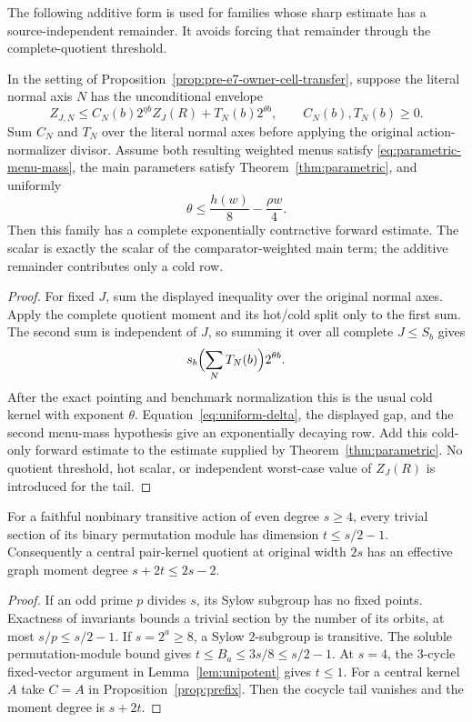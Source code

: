 The following additive form is used for families whose sharp estimate has a
source-independent remainder.  It avoids forcing that remainder through the
complete-quotient threshold.

\begin{proposition}
\label{prop:pre-e7-additive-tail-transfer}
In the setting of Proposition~\ref{prop:pre-e7-owner-cell-transfer}, suppose
the literal normal axis $N$ has the unconditional envelope
\[
 Z_{J,N}\leq C_N(b)2^{\eta b}Z_J(R)
                 +T_N(b)2^{\theta b},
 \qquad C_N(b),T_N(b)\geq0.
\]
Sum $C_N$ and $T_N$ over the literal normal axes before applying the original
action-normalizer divisor.  Assume both resulting weighted menus satisfy
\eqref{eq:parametric-menu-mass}, the main parameters satisfy
Theorem~\ref{thm:parametric}, and uniformly
\[
 \theta\leq \frac{h(w)}8-\frac{\rho w}4.
\]
Then this family has a complete exponentially contractive forward estimate.
The scalar is exactly the scalar of the comparator-weighted main term; the
additive remainder contributes only a cold row.
\end{proposition}
\begin{proof}
For fixed $J$, sum the displayed inequality over the original normal axes.
Apply the complete quotient moment and its hot/cold split only to the first
sum.  The second sum is independent of $J$, so summing it over all complete
$J\leq S_b$ gives
\[
 s_b\Bigl(\sum_NT_N(b)\Bigr)2^{\theta b}.
\]
After the exact pointing and benchmark normalization this is the usual cold
kernel with exponent $\theta$.  Equation~\eqref{eq:uniform-delta}, the
displayed gap, and the second menu-mass hypothesis give an exponentially
decaying row.  Add this cold-only forward estimate to the estimate supplied
by Theorem~\ref{thm:parametric}.  No quotient threshold, hot scalar, or
independent worst-case value of $Z_J(R)$ is introduced for the tail.
\end{proof}

\begin{lemma}\label{lem:central-pair}
For a faithful nonbinary transitive action of even degree $s\geq4$,
every trivial section of its binary permutation module has dimension
$t\leq s/2-1$. Consequently a central pair-kernel quotient at original
width $2s$ has an effective graph moment degree $s+2t\leq2s-2$.
\end{lemma}
\begin{proof}
If an odd prime $p$ divides $s$, its Sylow subgroup has no fixed
points. Exactness of invariants bounds a trivial section by the number
of its orbits, at most $s/p\leq s/2-1$.
If $s=2^a\geq8$, a Sylow $2$-subgroup is transitive. The soluble
permutation-module bound gives $t\leq B_a\leq3s/8\leq s/2-1$.
At $s=4$, the $3$-cycle fixed-vector argument in
Lemma~\ref{lem:unipotent} gives $t\leq1$.
For a central kernel $A$ take $C=A$ in Proposition~\ref{prop:prefix}.
Then the cocycle tail vanishes and the moment degree is $s+2t$.
\end{proof}

